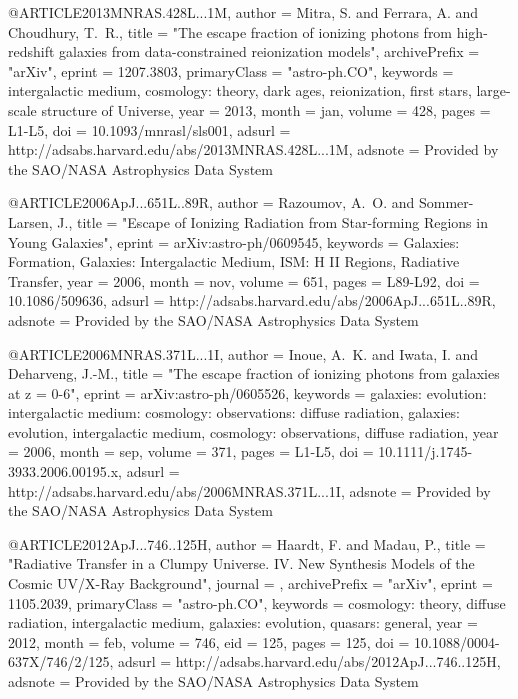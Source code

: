 \documentclass{article}
\begin{document}
@ARTICLE{2013MNRAS.428L...1M,
   author = {{Mitra}, S. and {Ferrara}, A. and {Choudhury}, T.~R.},
    title = "{The escape fraction of ionizing photons from high-redshift galaxies from data-constrained reionization models}",
archivePrefix = "arXiv",
   eprint = {1207.3803},
 primaryClass = "astro-ph.CO",
 keywords = {intergalactic medium, cosmology: theory, dark ages, reionization, first stars, large-scale structure of Universe},
     year = 2013,
    month = jan,
   volume = 428,
    pages = {L1-L5},
      doi = {10.1093/mnrasl/sls001},
   adsurl = {http://adsabs.harvard.edu/abs/2013MNRAS.428L...1M},
  adsnote = {Provided by the SAO/NASA Astrophysics Data System}
}

@ARTICLE{2006ApJ...651L..89R,
   author = {{Razoumov}, A.~O. and {Sommer-Larsen}, J.},
    title = "{Escape of Ionizing Radiation from Star-forming Regions in Young Galaxies}",
   eprint = {arXiv:astro-ph/0609545},
 keywords = {Galaxies: Formation, Galaxies: Intergalactic Medium, ISM: H II Regions, Radiative Transfer},
     year = 2006,
    month = nov,
   volume = 651,
    pages = {L89-L92},
      doi = {10.1086/509636},
   adsurl = {http://adsabs.harvard.edu/abs/2006ApJ...651L..89R},
  adsnote = {Provided by the SAO/NASA Astrophysics Data System}
}

@ARTICLE{2006MNRAS.371L...1I,
   author = {{Inoue}, A.~K. and {Iwata}, I. and {Deharveng}, J.-M.},
    title = "{The escape fraction of ionizing photons from galaxies at z = 0-6}",
   eprint = {arXiv:astro-ph/0605526},
 keywords = {galaxies: evolution: intergalactic medium: cosmology: observations: diffuse radiation, galaxies: evolution, intergalactic medium, cosmology: observations, diffuse radiation},
     year = 2006,
    month = sep,
   volume = 371,
    pages = {L1-L5},
      doi = {10.1111/j.1745-3933.2006.00195.x},
   adsurl = {http://adsabs.harvard.edu/abs/2006MNRAS.371L...1I},
  adsnote = {Provided by the SAO/NASA Astrophysics Data System}
}

@ARTICLE{2012ApJ...746..125H,
   author = {{Haardt}, F. and {Madau}, P.},
    title = "{Radiative Transfer in a Clumpy Universe. IV. New Synthesis Models of the Cosmic UV/X-Ray Background}",
  journal = {\apj},
archivePrefix = "arXiv",
   eprint = {1105.2039},
 primaryClass = "astro-ph.CO",
 keywords = {cosmology: theory, diffuse radiation, intergalactic medium, galaxies: evolution, quasars: general},
     year = 2012,
    month = feb,
   volume = 746,
      eid = {125},
    pages = {125},
      doi = {10.1088/0004-637X/746/2/125},
   adsurl = {http://adsabs.harvard.edu/abs/2012ApJ...746..125H},
  adsnote = {Provided by the SAO/NASA Astrophysics Data System}
}
\end{document}

